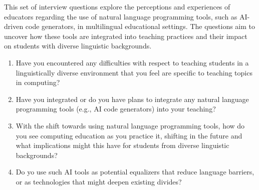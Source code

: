 {This set of interview questions explore the perceptions and experiences of
educators regarding the use of natural language programming tools, such as
AI-driven code generators, in multilingual educational settings. The questions
aim to uncover how these tools are integrated into teaching practices and their
impact on students with diverse linguistic backgrounds.
\begin{enumerate}[label={NLP.\arabic*}, align=left, leftmargin=4em]
  \item Have you encountered any difficulties with respect to teaching students
    in a linguistically diverse environment that you feel are specific to
    teaching topics in computing?
  \item Have you integrated or do you have plans to integrate any
    natural language programming tools (e.g., AI code generators) into your
    teaching? 
  \item With the shift towards using natural language programming tools, how do
    you see computing education as you practice it, shifting in the future and
    what implications might this have for students from diverse linguistic
    backgrounds?
  \item Do yo use such AI tools as potential equalizers that reduce language
    barriers, or as technologies that might deepen existing divides?
\end{enumerate}



}
